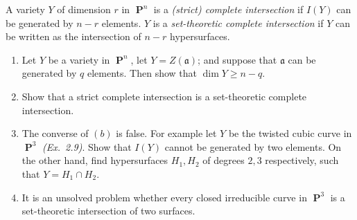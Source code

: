 \documentclass{hw_pset} %
\DeclareMathOperator{\pp}{\mathbf{P}} %
\begin{document}
\begin{solution}
    
\end{solution}

\begin{exercise}[2.17]
    A variety $Y$ of dimension $r$ in $\pp^n$ is a \emph{(strict) complete
    intersection} if $I(Y)$ can be generated by $n-r$ elements. $Y$ is a
    \emph{set-theoretic complete intersection} if $Y$ can be written as the
    intersection of $n-r$ hypersurfaces.
    \begin{enumerate}
    \item Let $Y$ be a variety in $\pp^n$, let $Y = Z(\mathfrak{a})$; and
    suppose that $\mathfrak{a}$ can be generated by $q$ elements. Then show
    that $\dim Y \ge n-q$. 
    \item Show that a strict complete intersection is a set-theoretic complete
    intersection.
    \item The converse of $(b)$ is false. For example let $Y$ be the twisted
    cubic curve in $\pp^3$ {\emph{(Ex.\ 2.9)}}. Show that
    $I(Y)$ cannot be generated by two elements. On the other hand, find
    hypersurfaces $H_1,H_2$ of degrees $2,3$ respectively, such that
    $Y = H_1 \cap H_2$. 
    \item It is an unsolved problem whether every closed irreducible curve in
    $\pp^3$ is a set-theoretic intersection of two surfaces.
    \end{enumerate}
\end{exercise}

\begin{solution}
    
\end{solution}
\end{document}
